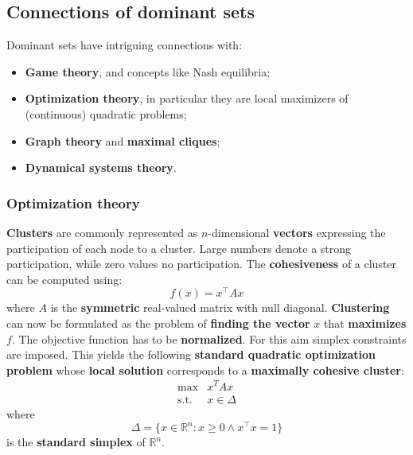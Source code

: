 \subsection{Connections of dominant sets}
Dominant sets have intriguing connections with:

\begin{itemize}
    \item \textbf{Game theory}, and concepts like Nash equilibria;
    \item \textbf{Optimization theory}, in particular they are local maximizers of (continuous) quadratic problems;
    \item \textbf{Graph theory} and \textbf{maximal cliques};
    \item \textbf{Dynamical systems theory}.
\end{itemize}

\subsubsection{Optimization theory}
\textbf{Clusters} are commonly represented as $n$-dimensional \textbf{vectors} expressing the participation of each node to a cluster. Large numbers denote a strong participation, while zero values no participation. The \textbf{cohesiveness} of a cluster can be computed using:
\begin{equation}
f(x)=x^\top Ax
\end{equation}
where $A$ is the \textbf{symmetric} real-valued matrix with null diagonal. \textbf{Clustering} can now be formulated as the problem of \textbf{finding the vector} $x$ that \textbf{maximizes} $f$. The objective function has to be \textbf{normalized}. For this aim simplex constraints are imposed. This yields the following \textbf{standard quadratic optimization problem} whose \textbf{local solution} corresponds to a \textbf{maximally cohesive cluster}:
\begin{equation}\label{SPQ}
\begin{array}{lcl}
\text{max} & x^TAx \\
\text{s.t.} & x \in \Delta
\end{array}
\end{equation}
where
\begin{equation}
\Delta=\{x\in\mathbb{R}^n:x\geq 0 \land x^\top x = 1\}
\end{equation}
is the \textbf{standard simplex} of $\mathbb{R}^n$.\\


